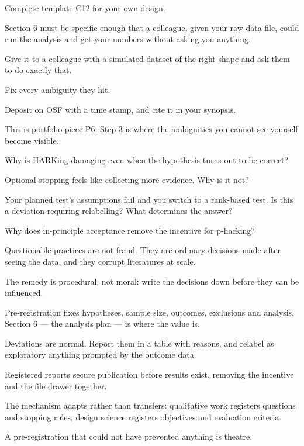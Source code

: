 \begin{lab}
\begin{tightnum}
  \item Complete template C12 for your own design.
  \item Section 6 must be specific enough that a colleague, given your raw data
    file, could run the analysis and get your numbers without asking you
    anything.
  \item Give it to a colleague with a simulated dataset of the right shape and
    ask them to do exactly that.
  \item Fix every ambiguity they hit.
  \item Deposit on OSF with a time stamp, and cite it in your synopsis.
\end{tightnum}

\medskip
This is portfolio piece P6. Step 3 is where the ambiguities you cannot see
yourself become visible.
\end{lab}

\begin{checkpoint}
\begin{tightnum}
  \item Why is HARKing damaging even when the hypothesis turns out to be
    correct?
  \item Optional stopping feels like collecting more evidence. Why is it not?
  \item Your planned test's assumptions fail and you switch to a rank-based
    test. Is this a deviation requiring relabelling? What determines the answer?
  \item Why does in-principle acceptance remove the incentive for p-hacking?
\end{tightnum}
\end{checkpoint}

\begin{chaptersummary}
\begin{tight}
  \item Questionable practices are not fraud. They are ordinary decisions made
    after seeing the data, and they corrupt literatures at scale.
  \item The remedy is procedural, not moral: write the decisions down before
    they can be influenced.
  \item Pre-registration fixes hypotheses, sample size, outcomes, exclusions and
    analysis. Section 6 --- the analysis plan --- is where the value is.
  \item Deviations are normal. Report them in a table with reasons, and relabel
    as exploratory anything prompted by the outcome data.
  \item Registered reports secure publication before results exist, removing the
    incentive and the file drawer together.
  \item The mechanism adapts rather than transfers: qualitative work registers
    questions and stopping rules, design science registers objectives and
    evaluation criteria.
  \item A pre-registration that could not have prevented anything is theatre.
\end{tight}
\end{chaptersummary}

